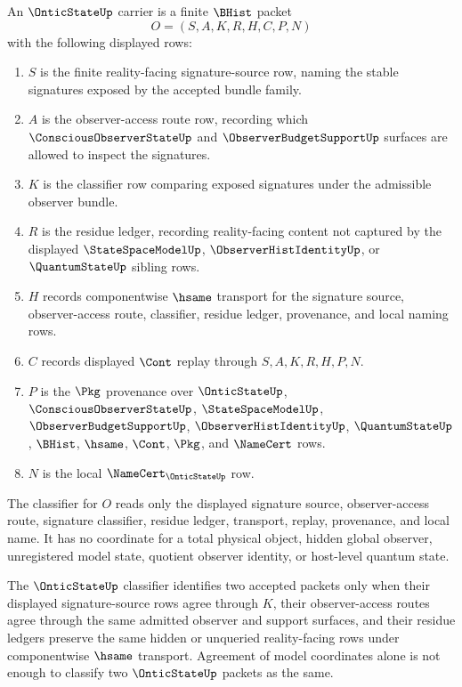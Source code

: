 \begin{definition}
\label{def:onticstate-carrier}
An $\OnticStateUp$ carrier is a finite $\BHist$ packet
$$
O=(S,A,K,R,H,C,P,N)
$$
with the following displayed rows:
\begin{enumerate}
\item $S$ is the finite reality-facing signature-source row, naming the stable signatures exposed by the accepted bundle family.
\item $A$ is the observer-access route row, recording which $\ConsciousObserverStateUp$ and $\ObserverBudgetSupportUp$ surfaces are allowed to inspect the signatures.
\item $K$ is the classifier row comparing exposed signatures under the admissible observer bundle.
\item $R$ is the residue ledger, recording reality-facing content not captured by the displayed $\StateSpaceModelUp$, $\ObserverHistIdentityUp$, or $\QuantumStateUp$ sibling rows.
\item $H$ records componentwise $\hsame$ transport for the signature source, observer-access route, classifier, residue ledger, provenance, and local naming rows.
\item $C$ records displayed $\Cont$ replay through $S,A,K,R,H,P,N$.
\item $P$ is the $\Pkg$ provenance over $\OnticStateUp$, $\ConsciousObserverStateUp$, $\StateSpaceModelUp$, $\ObserverBudgetSupportUp$, $\ObserverHistIdentityUp$, $\QuantumStateUp$, $\BHist$, $\hsame$, $\Cont$, $\Pkg$, and $\NameCert$ rows.
\item $N$ is the local $\NameCert_{\OnticStateUp}$ row.
\end{enumerate}
The classifier for $O$ reads only the displayed signature source, observer-access route, signature classifier, residue ledger, transport, replay, provenance, and local name. It has no coordinate for a total physical object, hidden global observer, unregistered model state, quotient observer identity, or host-level quantum state.
\end{definition}

\begin{definition}
\label{def:onticstate-classifier}
The $\OnticStateUp$ classifier identifies two accepted packets only when their displayed signature-source rows agree through $K$, their observer-access routes agree through the same admitted observer and support surfaces, and their residue ledgers preserve the same hidden or unqueried reality-facing rows under componentwise $\hsame$ transport. Agreement of model coordinates alone is not enough to classify two $\OnticStateUp$ packets as the same.
\end{definition}

